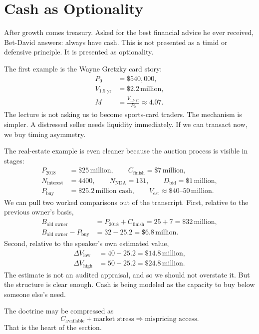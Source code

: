 \section{Cash as Optionality}

After growth comes treasury. Asked for the best financial advice he ever received, Bet-David answers: always have cash. This is not presented as a timid or defensive principle. It is presented as optionality.

The first example is the Wayne Gretzky card story:
\begin{align}
P_0 &= \$540{,}000,\\
V_{1.5\text{ yr}} &= \$2.2\,\text{million},\\
M &= \frac{V_{1.5\text{ yr}}}{P_0} \approx 4.07.
\end{align}
The lecture is not asking us to become sports-card traders. The mechanism is simpler. A distressed seller needs liquidity immediately. If we can transact now, we buy timing asymmetry.

The real-estate example is even cleaner because the auction process is visible in stages:
\begin{align}
P_{2018} &= \$25\,\text{million},\qquad
C_{\text{finish}} = \$7\,\text{million},\\
N_{\text{interest}} &= 4400,\qquad
N_{\text{NDA}} = 131,\qquad
D_{\text{bid}} = \$1\,\text{million},\\
P_{\text{buy}} &= \$25.2\,\text{million cash},\qquad
V_{\text{est}} \approx \$40\text{--}50\,\text{million}.
\end{align}
We can pull two worked comparisons out of the transcript. First, relative to the previous owner's basis,
\begin{align}
B_{\text{old owner}} &= P_{2018}+C_{\text{finish}} = 25+7 = \$32\,\text{million},\\
B_{\text{old owner}} - P_{\text{buy}} &= 32-25.2 = \$6.8\,\text{million}.
\end{align}
Second, relative to the speaker's own estimated value,
\begin{align}
\Delta V_{\text{low}} &= 40-25.2 = \$14.8\,\text{million},\\
\Delta V_{\text{high}} &= 50-25.2 = \$24.8\,\text{million}.
\end{align}
The estimate is not an audited appraisal, and so we should not overstate it. But the structure is clear enough. Cash is being modeled as the capacity to buy below someone else's need.

The doctrine may be compressed as
\begin{equation}
C_{\text{available}}+\text{market stress}\Rightarrow \text{mispricing access}.
\end{equation}
That is the heart of the section.

